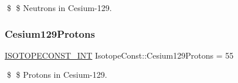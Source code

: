 \$ \$ Neutrons in Cesium-\/129. \mbox{\label{group___isotope_const-_cesium-_cs129_gad8af7438b61c65aac0365903d44223c2}} 
\subsubsection{\texorpdfstring{Cesium129\+Protons}{Cesium129Protons}}
{\footnotesize\ttfamily \mbox{\hyperlink{group___isotope_const-_macros_ga5f18360b3e99483a35c32d789e62621c}{I\+S\+O\+T\+O\+P\+E\+C\+O\+N\+S\+T\+\_\+\+I\+NT}} Isotope\+Const\+::\+Cesium129\+Protons = 55}

\$ \$ Protons in Cesium-\/129. 